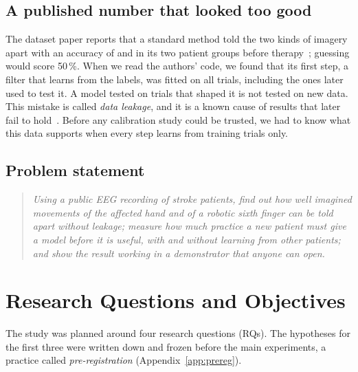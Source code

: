 \subsection{A published number that looked too good}
The dataset paper reports that a standard method told the two kinds of imagery apart
with an accuracy of \pct{\rqOnePublishedGroupBCspLda} and \pct{\rqOnePublishedGroupTCspLda}
in its two patient groups before therapy~\cite{wang2026dataset}; guessing would score
50\,\%. When we read the authors' code, we found that its first step, a filter that
learns from the labels, was fitted on all trials, including the ones later used to test
it. A model tested on trials that shaped it is not tested on new data. This mistake is called
\emph{data leakage}, and it is a known cause of results that later fail to
hold~\cite{kapoor2023,brookshire2024}. Before any calibration study could be trusted, we
had to know what this data supports when every step learns from training trials only.

\subsection{Problem statement}
\begin{quote}
\emph{Using a public EEG recording of stroke patients, find out how well imagined movements
of the affected hand and of a robotic sixth finger can be told apart without leakage;
measure how much practice a new patient must give a model before it is useful, with and
without learning from other patients; and show the result working in a demonstrator that
anyone can open.}
\end{quote}

\section{Research Questions and Objectives}\label{sec:intro-rq}

The study was planned around four research questions (RQs). The hypotheses for the
first three were written down and frozen before the main experiments, a practice called
\emph{pre-registration} (Appendix~\ref{app:prereg}).

